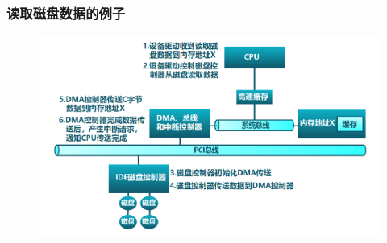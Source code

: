 \begin{frame}[fragile]
    \frametitle{读取磁盘数据的例子}
        \begin{figure}
            \includegraphics[width=0.8\linewidth]{figs/access-disk-io.png}
        \end{figure}
\end{frame}


